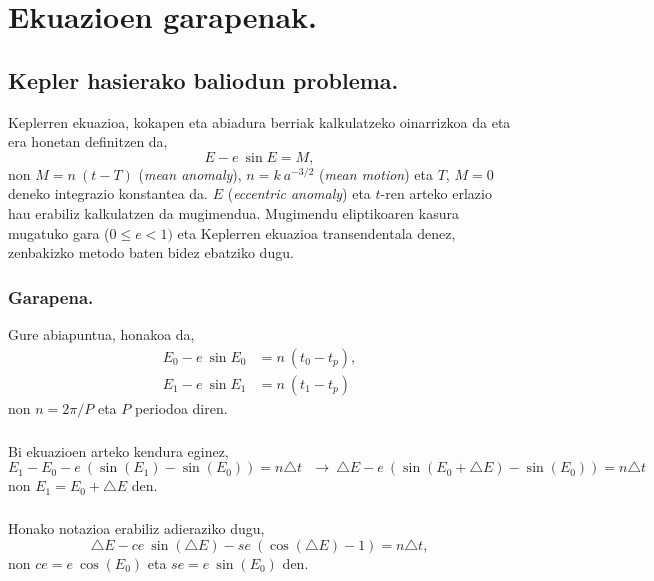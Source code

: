 \chapter{Ekuazioen garapenak.}
\label{eranskin:A}

\section{Kepler hasierako baliodun problema.}
\label{erans:A1}

Keplerren ekuazioa, kokapen eta abiadura berriak kalkulatzeko oinarrizkoa da eta era honetan definitzen da,
\begin{equation*}
E-e \ \sin E = M,
\end{equation*}
non $M=n \ (t-T)$ (\emph{mean anomaly}), $n=k \ a^{-3/2}$ (\emph{mean motion}) eta $T$, $M=0$ deneko integrazio konstantea da. $E$ (\emph{eccentric anomaly}) eta $t$-ren arteko erlazio hau erabiliz kalkulatzen da mugimendua. Mugimendu eliptikoaren kasura mugatuko gara ($0\leq e < 1)$ eta Keplerren ekuazioa transendentala denez, zenbakizko metodo baten bidez ebatziko dugu.

\subsection*{Garapena.}

Gure abiapuntua, honakoa da,
\begin{align*}
E_0-e \ \sin E_0 & =n \ (t_0-t_p), \\
E_1-e \ \sin E_1 & =n \ (t_1-t_p)
\end{align*}
non $n=2\pi/P$ eta $P$ periodoa diren.

\paragraph*{} Bi ekuazioen arteko kendura eginez,
\begin{equation*}
E_1-E_0-e \ (\sin(E_1)-\sin(E_0))=n \triangle t \ \ \ \longrightarrow \ \triangle E - e \ (\sin(E_0+\triangle E)-\sin(E_0))=n \triangle t
\end{equation*}
non $E_1=E_0+\triangle E$ den.  

\paragraph*{} Honako notazioa erabiliz adieraziko dugu,
\begin{equation*}
\triangle E - ce \ \sin(\triangle E)- se \ (\cos(\triangle E)-1)=n \triangle t,
\end{equation*}
non $ce=e \ \cos(E_0)$ eta $se=e \ \sin(E_0)$ den.

